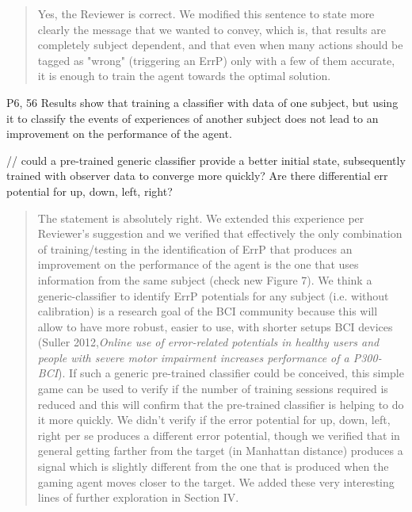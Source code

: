 \documentclass[journal,onecolumn,12pt]{IEEEtran}
\begin{document}
\vspace{2em}
\begin{quotation}
{\color{blue}
Yes, the Reviewer is correct.  We modified this sentence to state more clearly the message that we wanted to convey, which is, that results are completely subject dependent, and that even when many actions should be tagged as "wrong" (triggering an ErrP) only with a few of them accurate, it is enough to train the agent towards the optimal solution.
}
\end{quotation}
\vspace{2em}

P6, 56
Results show that training a classifier with data of one subject, but using it
to classify the events of experiences of another subject does
not lead to an improvement on the performance of the agent.

// could a pre-trained generic classifier provide a better initial state, subsequently trained with observer data to converge more quickly?
Are there differential err potential for up, down, left, right?

\vspace{2em}
\begin{quotation}
{\color{blue}
The statement is absolutely right.  We extended this experience per Reviewer's suggestion and we verified that effectively the only combination of training/testing in the identification of ErrP that produces an improvement on the performance of the agent is the one that uses information from the same subject (check new Figure 7).   We think a generic-classifier to identify ErrP potentials for any subject (i.e. without calibration) is a research goal of the BCI community because this will allow to have more robust, easier to use, with shorter setups  BCI devices (Suller 2012,\textit{Online use of error-related potentials in healthy users and people with severe motor impairment increases performance of a P300-BCI}).  If such a generic pre-trained classifier could be conceived, this simple game can be used to verify if the number of training sessions required is reduced and this will confirm that the pre-trained classifier is helping to do it more quickly.  We didn't verify if the error potential for up, down, left, right per se produces a different error potential, though we verified that in general getting farther from the target (in Manhattan distance) produces a signal which is slightly different from the one that is produced when the gaming agent moves closer to the target.  We added these very interesting lines of further exploration in Section IV.
}
\end{quotation}
\vspace{2em}
\end{document}
